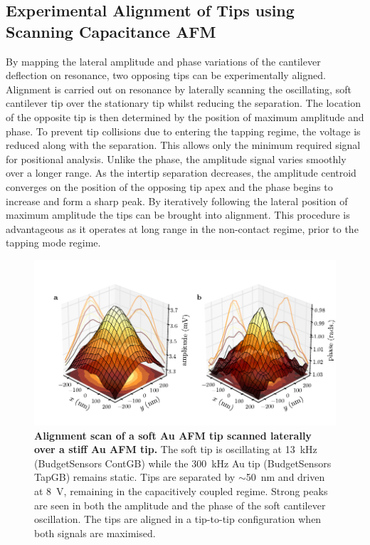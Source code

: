 \documentclass{article}
\begin{document}
\subsection{Experimental Alignment of Tips using Scanning Capacitance AFM}

By mapping the lateral amplitude and phase variations of the cantilever deflection on resonance, two opposing tips can be experimentally aligned. Alignment is carried out on resonance by laterally scanning the oscillating, soft cantilever tip over the stationary tip whilst reducing the separation. The location of the opposite tip is then determined by the position of maximum amplitude and phase. To prevent tip collisions due to entering the tapping regime, the voltage is reduced along with the separation. This allows only the minimum required signal for positional analysis. Unlike the phase, the amplitude signal varies smoothly over a longer range. As the intertip separation decreases, the amplitude centroid converges on the position of the opposing tip apex and the phase begins to increase and form a sharp peak.  By iteratively following the lateral position of maximum amplitude the tips can be brought into alignment. This procedure is advantageous as it operates at long range in the non-contact regime, prior to the tapping mode regime.

\begin{figure}[bt]
\centering
\includegraphics[clip=true, trim=27 19 0 33]{figures/alignment_scan}
\caption[Alignment scan of a soft Au AFM tip scanned laterally over a stiff Au AFM tip]{\textbf{Alignment scan of a soft Au AFM tip scanned laterally over a stiff Au AFM tip.} The soft tip is oscillating at \SI{13}{kHz} (BudgetSensors ContGB) while the \SI{300}{kHz} Au tip (BudgetSensors TapGB) remains static. Tips are separated by $\sim$\SI{50}{nm} and driven at \SI{8}{V}, remaining in the capacitively coupled regime. Strong peaks are seen in both the amplitude and the phase of the soft cantilever oscillation. The tips are aligned in a tip-to-tip configuration when both signals are maximised.}
\label{fig:alignment_scan} 
\end{figure}
\end{document}
